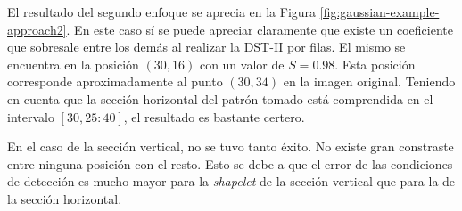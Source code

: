 El resultado del segundo enfoque se aprecia en la Figura \ref{fig:gaussian-example-approach2}.
En este caso sí se puede apreciar claramente que existe un coeficiente que sobresale
entre los demás al realizar la DST-II por filas. El mismo se encuentra en la posición $(30,16)$ con un valor de $S=0.98$.
Esta posición corresponde aproximadamente al punto $(30,34)$ en la imagen original. Teniendo en cuenta que la
sección horizontal del patrón tomado está comprendida en el intervalo $[30,25:40]$, el resultado es bastante certero.

En el caso de la sección vertical, no se tuvo tanto éxito. No existe gran constraste entre ninguna posición con el resto. 
Esto se debe a que el error de las condiciones de detección es mucho mayor para la \textit{shapelet} de la sección
vertical que para la de la sección horizontal.

